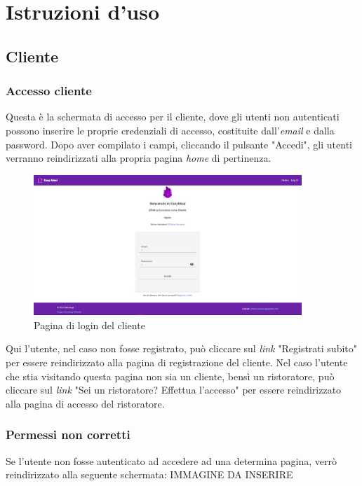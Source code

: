 \section{Istruzioni d'uso}

\subsection{Cliente} %

\subsubsection{Accesso cliente}
Questa è la schermata di accesso per il cliente, dove gli utenti non autenticati possono inserire le proprie credenziali di accesso, costituite dall'\textit{email} e dalla {password}. 
Dopo aver compilato i campi, cliccando il pulsante "Accedi", gli utenti verranno reindirizzati alla propria pagina \textit{home} di pertinenza.

\begin{figure}[h]
    \centering
    \includegraphics[width=0.9\textwidth]{./img/loginCliente.jpg}
    \caption{Pagina di login del cliente}
    \label{fig:esempio}
\end{figure}

Qui l'utente, nel caso non fosse registrato, può cliccare sul \textit{link} "Registrati subito" per essere reindirizzato alla pagina di registrazione del cliente.
Nel caso l'utente che stia visitando questa pagina non sia un cliente, bensì un ristoratore, può cliccare sul \textit{link} "Sei un ristoratore? Effettua l'accesso" 
per essere reindirizzato alla pagina di accesso del ristoratore.

\subsubsection{Permessi non corretti}
Se l'utente non fosse autenticato ad accedere ad una determina pagina, verrò reindirizzato alla seguente schermata:
IMMAGINE DA INSERIRE

